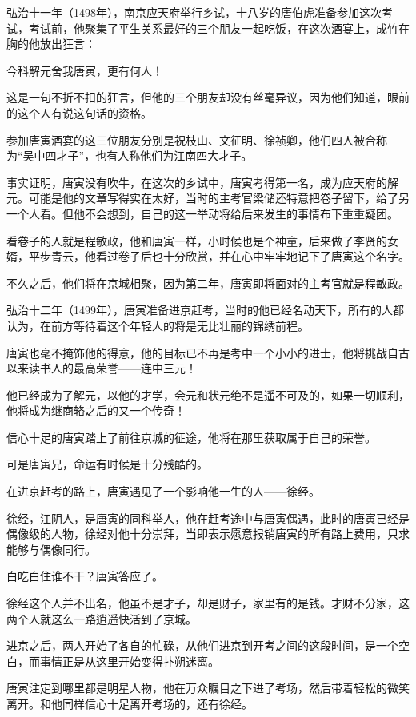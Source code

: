 \begin{multicols}{\theparacolNo}
		弘治十一年（1498年），南京应天府举行乡试，十八岁的唐伯虎准备参加这次考试，考试前，他聚集了平生关系最好的三个朋友一起吃饭，在这次酒宴上，成竹在胸的他放出狂言：

		今科解元舍我唐寅，更有何人！

		这是一句不折不扣的狂言，但他的三个朋友却没有丝毫异议，因为他们知道，眼前的这个人有说这句话的资格。

		参加唐寅酒宴的这三位朋友分别是祝枝山、文征明、徐祯卿，他们四人被合称为“吴中四才子”，也有人称他们为江南四大才子。

		事实证明，唐寅没有吹牛，在这次的乡试中，唐寅考得第一名，成为应天府的解元。可能是他的文章写得实在太好，当时的主考官梁储还特意把卷子留下，给了另一个人看。但他不会想到，自己的这一举动将给后来发生的事情布下重重疑团。

		看卷子的人就是程敏政，他和唐寅一样，小时候也是个神童，后来做了李贤的女婿，平步青云，他看过卷子后也十分欣赏，并在心中牢牢地记下了唐寅这个名字。

		不久之后，他们将在京城相聚，因为第二年，唐寅即将面对的主考官就是程敏政。

		弘治十二年（1499年），唐寅准备进京赶考，当时的他已经名动天下，所有的人都认为，在前方等待着这个年轻人的将是无比壮丽的锦绣前程。

		唐寅也毫不掩饰他的得意，他的目标已不再是考中一个小小的进士，他将挑战自古以来读书人的最高荣誉——连中三元！

		他已经成为了解元，以他的才学，会元和状元绝不是遥不可及的，如果一切顺利，他将成为继商辂之后的又一个传奇！

		信心十足的唐寅踏上了前往京城的征途，他将在那里获取属于自己的荣誉。

		可是唐寅兄，命运有时候是十分残酷的。

		在进京赶考的路上，唐寅遇见了一个影响他一生的人——徐经。

		徐经，江阴人，是唐寅的同科举人，他在赶考途中与唐寅偶遇，此时的唐寅已经是偶像级的人物，徐经对他十分崇拜，当即表示愿意报销唐寅的所有路上费用，只求能够与偶像同行。

		白吃白住谁不干？唐寅答应了。

		徐经这个人并不出名，他虽不是才子，却是财子，家里有的是钱。才财不分家，这两个人就这么一路逍遥快活到了京城。

		进京之后，两人开始了各自的忙碌，从他们进京到开考之间的这段时间，是一个空白，而事情正是从这里开始变得扑朔迷离。

		唐寅注定到哪里都是明星人物，他在万众瞩目之下进了考场，然后带着轻松的微笑离开。和他同样信心十足离开考场的，还有徐经。


\end{multicols}
